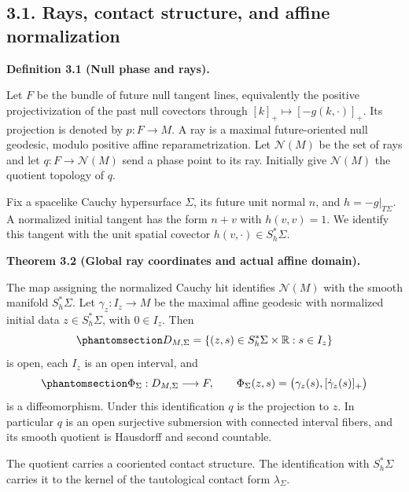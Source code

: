 \documentclass[
  english,
  11pt,
  reqno]{amsart}
\makeatletter
\newcommand{\paperdisplaynext}{%
  \let\paper@savedstartsection\@startsection
  \def\@startsection##1##2##3##4##5##6{%
    \let\@startsection\paper@savedstartsection
    \@tempskipa ##5\relax
    \ifdim\@tempskipa<\z@
      \def\paper@afterskip{.35\baselineskip}%
    \else
      \def\paper@afterskip{##5}%
    \fi
    \@startsection{##1}{##2}{##3}{##4}{\paper@afterskip}{##6}}}
\newcommand{\paperdisplaysection}{\paperdisplaynext\subsection}
\newcommand{\pandocstatementheading}[1]{%
  \par\if@nobreak\else
    \addpenalty{\@beginparpenalty}%
    \addvspace{.5\baselineskip plus .2\baselineskip minus .2\baselineskip}%
  \fi
  {\normalfont\bfseries #1\par}%
  \nobreak\@afterindenttrue\@afterheading
}
\makeatother
\begin{document}
\protect{}\label{sec:null-rays-and-affine-domains}
\paperdisplaysection{3.1. Rays, contact structure, and affine
normalization}\label{rays-contact-structure-and-affine-normalization}
\pandocstatementheading{\protect{}\label{def:global-null-ray-data}Definition 3.1 (Null phase and rays).}

Let \(F\) be the bundle of future null tangent lines, equivalently the
positive projectivization of the past null covectors through
\([k]_+\mapsto[-g(k,\cdot)]_+\). Its projection is denoted by
\(p:F\to M\). A ray is a maximal future-oriented null geodesic, modulo
positive affine reparametrization. Let \(\mathcal N(M)\) be the set of
rays and let \(q:F\to\mathcal N(M)\) send a phase point to its ray.
Initially give \(\mathcal N(M)\) the quotient topology of \(q\).

Fix a spacelike Cauchy hypersurface \(\Sigma\), its future unit normal
\(n\), and \(h=-g|_{T\Sigma}\). A normalized initial tangent has the
form \(n+v\) with \(h(v,v)=1\). We identify this tangent with the unit
spatial covector \(h(v,\cdot)\in S_h^*\Sigma\).

\pandocstatementheading{\protect{}\label{thm:global-real-ray-flow}Theorem 3.2 (Global ray coordinates and actual affine domain).}

The map assigning the normalized Cauchy hit identifies \(\mathcal N(M)\)
with the smooth manifold \(S_h^*\Sigma\). Let \(\gamma_z:I_z\to M\) be
the maximal affine geodesic with normalized initial data
\(z\in S_h^*\Sigma\), with \(0\in I_z\). Then
\begin{equation}\protect\phantomsection\label{eq:global-real-affine-domain}{
D_{M,\Sigma}=\{(z,s)\in S_h^*\Sigma\times\mathbb R:s\in I_z\}
}\end{equation} is open, each \(I_z\) is an open interval, and
\begin{equation}\protect\phantomsection\label{eq:global-real-affine-flow}{
\Phi_\Sigma:D_{M,\Sigma}\longrightarrow F,
\qquad
\Phi_\Sigma(z,s)=\bigl(\gamma_z(s),[\dot\gamma_z(s)]_+\bigr)
}\end{equation} is a diffeomorphism. Under this identification \(q\) is
the projection to \(z\). In particular \(q\) is an open surjective
submersion with connected interval fibers, and its smooth quotient is
Hausdorff and second countable.

The quotient carries a cooriented contact structure. The identification
with \(S_h^*\Sigma\) carries it to the kernel of the tautological
contact form \(\lambda_\Sigma\).
\end{document}
